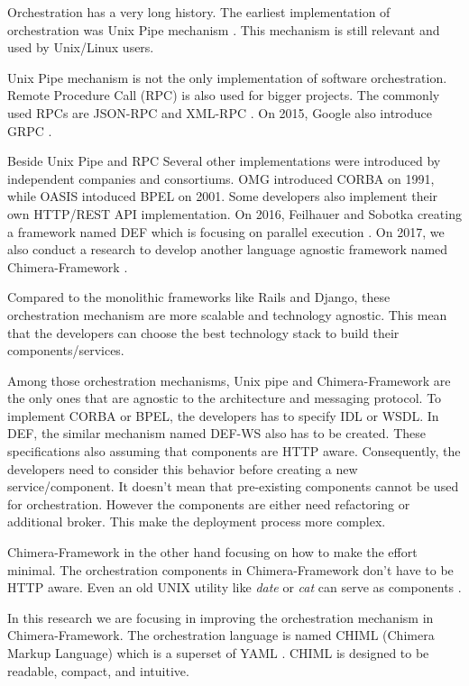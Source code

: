 \documentclass[conference]{IEEEtran}
\begin{document}
Orchestration has a very long history. The earliest implementation of orchestration was Unix Pipe mechanism \cite{mcilroy1968mass}. This mechanism is still relevant and used by Unix/Linux users.

Unix Pipe mechanism is not the only implementation of software orchestration. Remote Procedure Call (RPC) is also used for bigger projects. The commonly used RPCs are JSON-RPC \cite{jsonrpc} and XML-RPC \cite{xmlrpc}. On 2015, Google also introduce GRPC \cite{grpc}.

Beside Unix Pipe and RPC Several other implementations were introduced by independent companies and consortiums. OMG introduced CORBA on 1991, while OASIS intoduced BPEL on 2001. Some developers also implement their own HTTP/REST API implementation. On 2016, Feilhauer and Sobotka creating a framework named DEF which is focusing on parallel execution \cite{feilhauer2016def}. On 2017, we also conduct a research to develop another language agnostic framework named Chimera-Framework \cite{gunawan2017chimera}.

Compared to the monolithic frameworks like Rails and Django, these orchestration mechanism are more scalable and technology agnostic. This mean that the developers can choose the best technology stack to build their components/services.

Among those orchestration mechanisms, Unix pipe and Chimera-Framework are the only ones that are agnostic to the architecture and messaging protocol. To implement CORBA or BPEL, the developers has to specify IDL or WSDL. In DEF, the similar mechanism named DEF-WS also has to be created. These specifications also assuming that components are HTTP aware. Consequently, the developers need to consider this behavior before creating a new service/component. It doesn't mean that pre-existing components cannot be used for orchestration. However the components are either need refactoring or additional broker. This make the deployment process more complex.

Chimera-Framework in the other hand focusing on how to make the effort minimal. The orchestration components in Chimera-Framework don't have to be HTTP aware. Even an old UNIX utility like {\it date} or {\it cat} can serve as components \cite{gunawan2017chimera}.

In this research we are focusing in improving the orchestration mechanism in Chimera-Framework. The orchestration language is named CHIML (Chimera Markup Language) which is a superset of YAML \cite{yaml}. CHIML is designed to be readable, compact, and intuitive.
\end{document}
